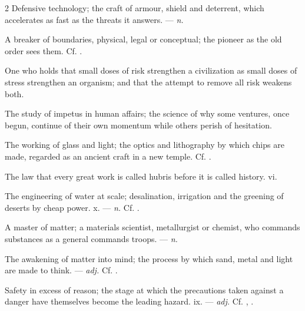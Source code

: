 \begin{multicols}{2}
 Defensive technology; the craft of armour, shield and deterrent, which accelerates as fast as the threats it answers. —  \textit{n.}

 A breaker of boundaries, physical, legal or conceptual; the pioneer as the old order sees them. Cf. .

 One who holds that small doses of risk strengthen a civilization as small doses of stress strengthen an organism; and that the attempt to remove all risk weakens both.

 The study of impetus in human affairs; the science of why some ventures, once begun, continue of their own momentum while others perish of hesitation.

 The working of glass and light; the optics and lithography by which chips are made, regarded as an ancient craft in a new temple. Cf. .

 The law that every great work is called hubris before it is called history.   vi.

 The engineering of water at scale; desalination, irrigation and the greening of deserts by cheap power.   x. —  \textit{n.} Cf. .

 A master of matter; a materials scientist, metallurgist or chemist, who commands substances as a general commands troops. —  \textit{n.}

 The awakening of matter into mind; the process by which sand, metal and light are made to think. —  \textit{adj.} Cf. .

 Safety in excess of reason; the stage at which the precautions taken against a danger have themselves become the leading hazard.   ix. —  \textit{adj.} Cf. , .


\end{multicols}
